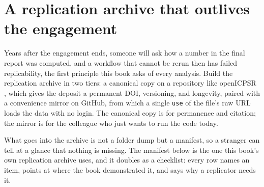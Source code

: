 \section{A replication archive that outlives the engagement}\label{sec:archive}
Years after the engagement ends, someone will ask how a number in the final report was computed, and a workflow that cannot be rerun then has failed replicability, the first principle this book asks of every analysis. Build the replication archive in two tiers: a canonical copy on a repository like openICPSR \parencite{openicpsr}, which gives the deposit a permanent DOI, versioning, and longevity, paired with a convenience mirror on GitHub, from which a single \texttt{use} of the file's raw URL loads the data with no login. The canonical copy is for permanence and citation; the mirror is for the colleague who just wants to run the code today.

What goes into the archive is not a folder dump but a manifest, so a stranger can tell at a glance that nothing is missing. The manifest below is the one this book's own replication archive uses, and it doubles as a checklist: every row names an item, points at where the book demonstrated it, and says why a replicator needs it.

